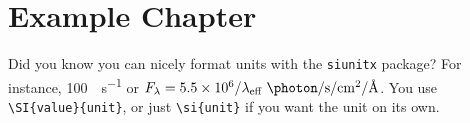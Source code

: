 \chapter{Example Chapter}
\label{chap:chapter2}

Did you know you can nicely format units with the \texttt{siunitx} package? For instance, \SI{100}{\solarmass\per\second} or $F_\lambda = 5.5 \times 10^{6}/\lambda_\text{eff}~\si{\photon\per\second\per\centi\metre\squared\per\angstrom}$. You use \texttt{\textbackslash{}SI\{value\}\{unit\}}, or just \texttt{\textbackslash{}si\{unit\}} if you want the unit on its own.
